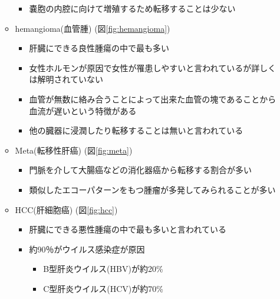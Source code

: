\documentclass[a4j]{ujarticle}
\newcommand{\Fref}[1]{\mbox{図\ref{fig:#1}}}
\begin{document}
\begin{itemize}
\begin{itemize}
\begin{itemize}
                    \item 嚢胞の内腔に向けて増殖するため転移することは少ない
                \end{itemize}
                \item hemangioma(血管腫) (\Fref{hemangioma})
                \begin{itemize}
                    \item 肝臓にできる良性腫瘍の中で最も多い
                    \item 女性ホルモンが原因で女性が罹患しやすいと言われているが詳しくは解明されていない
                    \item 血管が無数に絡み合うことによって出来た血管の塊であることから血流が遅いという特徴がある
                    \item 他の臓器に浸潤したり転移することは無いと言われている
                \end{itemize}
                \item Meta(転移性肝癌) (\Fref{meta})
                \begin{itemize}
                    \item 門脈を介して大腸癌などの消化器癌から転移する割合が多い
                    \item 類似したエコーパターンをもつ腫瘤が多発してみられることが多い
                \end{itemize}
                \item HCC(肝細胞癌) (\Fref{hcc})
                \begin{itemize}
                    \item 肝臓にできる悪性腫瘍の中で最も多いと言われている
                    \item 約90％がウイルス感染症が原因
                    \begin{itemize}
                        \item B型肝炎ウイルス(HBV)が約20\%
                        \item C型肝炎ウイルス(HCV)が約70\%
                    \end{itemize}
                \end{itemize}
            \end{itemize}
        \end{itemize}
\end{document}
